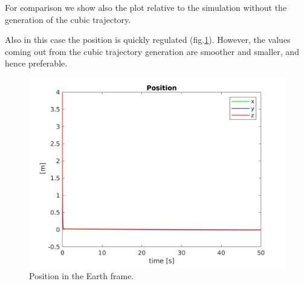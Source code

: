 \documentclass[11pt,a4paper]{scrartcl}
\begin{document}
For comparison we show also the plot relative to the simulation without the generation of the cubic trajectory. 

Also in this case the position is quickly regulated (fig.\ref{fig:outercontrolposNO}). However, the values coming out from the cubic trajectory generation are smoother and smaller, and hence preferable.

\begin{figure}[H]
	\centering
	\includegraphics[width=0.7\linewidth]{Images/PositionOuterNO.png}
	\caption{Position in the Earth frame.}
	\label{fig:outercontrolposNO}	
\end{figure} 
\end{document}
